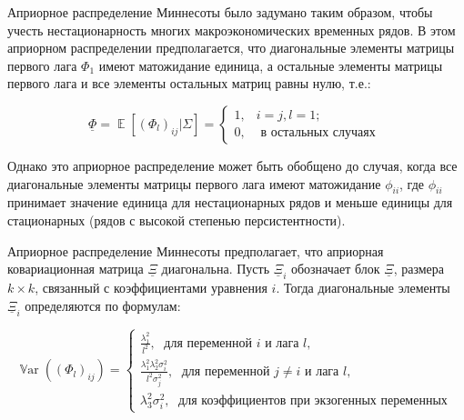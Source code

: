 \documentclass[11pt]{article} %
\DeclareMathOperator{\E}{\mathbb{E}}
\DeclareMathOperator{\Var}{\mathbb{V}\mathrm{ar}}
\begin{document}
Априорное распределение Миннесоты было задумано таким образом, чтобы учесть нестационарность многих макроэкономических временных рядов. В этом априорном распределении предполагается, что диагональные элементы матрицы первого лага $\Phi_1$ имеют матожидание единица, а остальные элементы матрицы первого лага и все элементы остальных матриц равны нулю, т.е.:

\begin{equation}
\underline{\Phi}=\E[(\Phi_l)_{ij}|\Sigma]=\begin{cases}
1,& i=j, l=1;\\
0,&\text{ в остальных случаях }
\end{cases}\label{minnesota_exp}
\end{equation}

Однако это априорное распределение может быть обобщено до случая, когда все диагональные элементы матрицы первого лага имеют матожидание $\phi_{ii}$, где $\phi_{ii}$ принимает значение единица для нестационарных рядов и меньше единицы для стационарных (рядов с высокой степенью персистентности).

Априорное распределение Миннесоты предполагает, что априорная ковариационная матрица $\underline \Xi$ диагональна.
Пусть $\underline \Xi_i$ обозначает блок $\underline \Xi$, размера $k\times k$, связанный с коэффициентами уравнения $i$. Тогда  диагональные элементы  $\underline \Xi_i$ определяются по формулам:

\begin{equation}
\Var((\Phi_l)_{ij})=\begin{cases}
\frac{\lambda_1^2}{l^2}, \; \text{ для переменной  } i \text{ и лага } l,\\
\frac{\lambda_1^2\lambda_2^2\sigma^2_i}{l^2\sigma^2_j}, \; \text{ для переменной } j\neq i \text{ и лага } l, \\
\lambda_3^2\sigma_i^2, \; \text{ для коэффициентов при экзогенных переменных }
\end{cases}
\label{minnesota_variance}
\end{equation}

\end{document}
